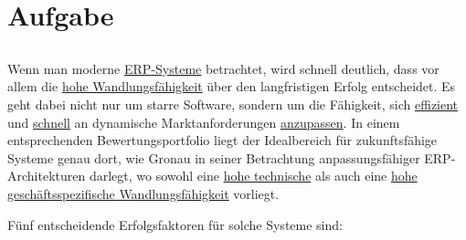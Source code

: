
\chapter{Aufgabe}
\label{chap:1 Aufgabe}
\thispagestyle{fancy}
\section{} Wenn man moderne \uline{\acs{ERP}-Systeme} betrachtet, wird schnell deutlich, dass vor allem die \uline{hohe Wandlungsfähigkeit} über den langfristigen Erfolg entscheidet. Es geht dabei nicht nur um starre Software, sondern um die Fähigkeit, sich \uline{effizient} und \uline{schnell} an dynamische Marktanforderungen \uline{anzupassen}. In einem entsprechenden Bewertungsportfolio liegt der Idealbereich für zukunftsfähige Systeme genau dort, wie Gronau \cite[49]{1} in seiner Betrachtung anpassungsfähiger \acs{ERP}-Architekturen darlegt, wo sowohl eine \uline{hohe technische} als auch eine \uline{hohe geschäftsspezifische Wandlungsfähigkeit} vorliegt. \par Fünf entscheidende Erfolgsfaktoren für solche Systeme sind:
